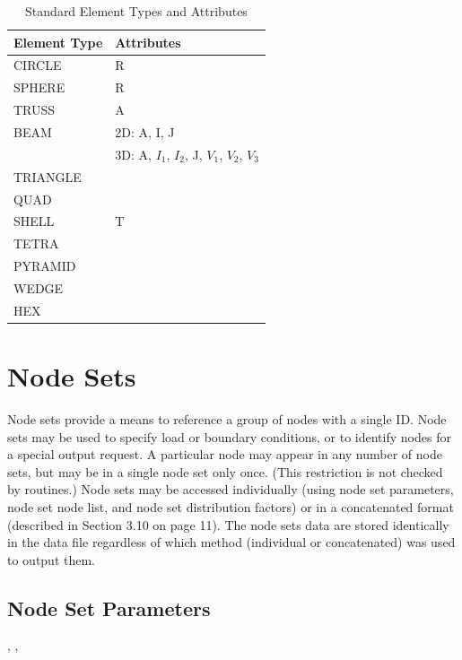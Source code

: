 \begin{table}[htbp]
\begin{center}
\begin{tabular}{|l|l|} \hline
Element Type & Attributes \\ \hline
CIRCLE   & R \\ \hline
SPHERE   & R \\ \hline
TRUSS    & A \\ \hline
BEAM     & 2D: A, I, J \\
         & 3D: A, $I_1$, $I_2$, J, $V_1$, $V_2$, $V_3$ \\ \hline
TRIANGLE & \\ \hline
QUAD     & \\ \hline
SHELL    & T \\ \hline
TETRA    & \\ \hline
PYRAMID  & \\ \hline
WEDGE    & \\ \hline
HEX      & \\ \hline
\end{tabular}
\caption{Standard Element Types and Attributes}\label{t:element_types}
\end{center}
\end{table}

\section{Node Sets}

Node sets provide a means to reference a group of nodes with a single
ID. Node sets may be used to specify load or boundary
conditions, or to identify nodes for a special
output request. A particular node may appear in any number of node
sets, but may be in a single node set only once. (This restriction is
not checked by \exo{} routines.) Node sets may be accessed
individually (using node set parameters, node set node list, and node
set distribution factors) or in a concatenated format (described in
Section 3.10 on page 11). The node sets data are stored identically in
the data file regardless of which method (individual or concatenated)
was used to output them.

\subsection{Node Set Parameters}

\begin{spacing}{1.5}
\api {}, , 
\end{spacing}

